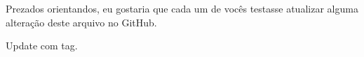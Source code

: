 \documentclass{article}
\begin{document}
Prezados orientandos,
eu gostaria que cada um de vocês testasse atualizar alguma alteração deste arquivo no GitHub.

	Update com tag.
\end{document}
